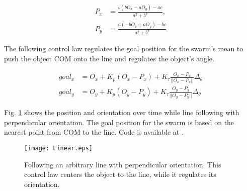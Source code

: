
\begin{align}
P_x &= \frac{b(bO_x-aO_y)-ac}{a^2 + b^2},\\ \nonumber
P_y &= \frac{a(-bO_x+aO_y)-bc}{a^2 + b^2}
\end{align}


The following control law regulates the goal position for the swarm's mean to push the object COM onto the line and regulates the object's angle.

\begin{align}
goal_x &= O_x+ K_p (O_x-P_x)+ K_\tau \frac{O_x-P_x}{||O_x-P_x||}\Delta_{\theta} \nonumber \\
goal_y &= O_y+ K_p (O_y-P_y)+ K_\tau \frac{O_y-P_y}{||O_y-P_y||}\Delta_{\theta} \label{eq:Regulate}
\end{align}

Fig. \ref{fig:Linear} shows the position and orientation over time 
while line following with perpendicular orientation.
The goal position for the swarm is based on the nearest point from COM to the line.
 Code is available at \cite{Shahrokhi16TorqueLine}.

\begin{figure}
\begin{center}
	\texttt{[image: Linear.eps]}
\end{center}
\vspace{-2em}
\caption{\label{fig:Linear} 
Following an arbitrary line with perpendicular orientation. This control law centers the object to the line, while it regulates its orientation.
}
\vspace{-1em}
\end{figure}



